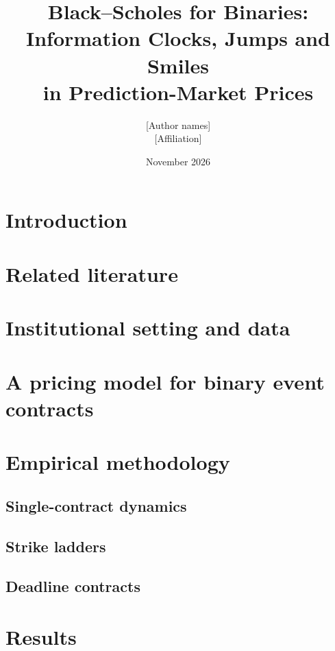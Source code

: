 \documentclass[11pt]{article}
\title{Black--Scholes for Binaries: Information Clocks, Jumps and Smiles\\in Prediction-Market Prices}
\author{[Author names]\\[2pt]\small [Affiliation]}
\date{November 2026}
\theoremstyle{definition}
\theoremstyle{remark}
\begin{document}
\maketitle
\begin{abstract}

\end{abstract}

\section{Introduction}\label{sec:intro}


\section{Related literature}\label{sec:lit}


\section{Institutional setting and data}\label{sec:data}


\section{A pricing model for binary event contracts}\label{sec:model}


\section{Empirical methodology}\label{sec:method}

\subsection{Single-contract dynamics}\label{sec:method-dyn}

\subsection{Strike ladders}\label{sec:method-lad}

\subsection{Deadline contracts}\label{sec:method-haz}


\section{Results}\label{sec:results}
\end{document}
